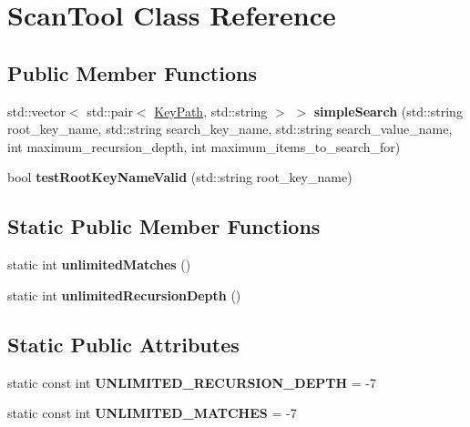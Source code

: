 \hypertarget{class_scan_tool}{}\section{Scan\+Tool Class Reference}
\label{class_scan_tool}
\subsection*{Public Member Functions}
\begin{DoxyCompactItemize}
\item 
\hypertarget{class_scan_tool_acc6643d8c5a139801f0a3ab33a4fd64b}{}std\+::vector$<$ std\+::pair$<$ \hyperlink{class_key_path}{Key\+Path}, std\+::string $>$ $>$ {\bfseries simple\+Search} (std\+::string root\+\_\+key\+\_\+name, std\+::string search\+\_\+key\+\_\+name, std\+::string search\+\_\+value\+\_\+name, int maximum\+\_\+recursion\+\_\+depth, int maximum\+\_\+items\+\_\+to\+\_\+search\+\_\+for)\label{class_scan_tool_acc6643d8c5a139801f0a3ab33a4fd64b}

\item 
\hypertarget{class_scan_tool_a1fd28a95d2d3d088fcc40ba1d4d886c5}{}bool {\bfseries test\+Root\+Key\+Name\+Valid} (std\+::string root\+\_\+key\+\_\+name)\label{class_scan_tool_a1fd28a95d2d3d088fcc40ba1d4d886c5}

\end{DoxyCompactItemize}
\subsection*{Static Public Member Functions}
\begin{DoxyCompactItemize}
\item 
\hypertarget{class_scan_tool_a40991a4b76a30662a9e9c3bd54aae071}{}static int {\bfseries unlimited\+Matches} ()\label{class_scan_tool_a40991a4b76a30662a9e9c3bd54aae071}

\item 
\hypertarget{class_scan_tool_ae4c8ee31af682ac9ec0fce9e861b38eb}{}static int {\bfseries unlimited\+Recursion\+Depth} ()\label{class_scan_tool_ae4c8ee31af682ac9ec0fce9e861b38eb}

\end{DoxyCompactItemize}
\subsection*{Static Public Attributes}
\begin{DoxyCompactItemize}
\item 
\hypertarget{class_scan_tool_aeb6d958e5b7465c2e6cf871928bf3868}{}static const int {\bfseries U\+N\+L\+I\+M\+I\+T\+E\+D\+\_\+\+R\+E\+C\+U\+R\+S\+I\+O\+N\+\_\+\+D\+E\+P\+T\+H} = -\/7\label{class_scan_tool_aeb6d958e5b7465c2e6cf871928bf3868}

\item 
\hypertarget{class_scan_tool_a9a62696f3cd27f7cbec7fb9c27b7b1ba}{}static const int {\bfseries U\+N\+L\+I\+M\+I\+T\+E\+D\+\_\+\+M\+A\+T\+C\+H\+E\+S} = -\/7\label{class_scan_tool_a9a62696f3cd27f7cbec7fb9c27b7b1ba}

\end{DoxyCompactItemize}


